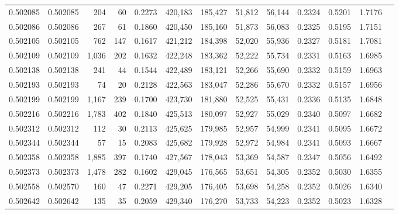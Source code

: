 \begin{tabular}{rrrrrrrrrrrrr}
0.502085 & 0.502085 &   204 &    60 &                                     0.2273 & 420,183 & 185,427 &  51,812 &  56,144 & 0.2324 & 0.5201 & 1.7176 \\
0.502086 & 0.502086 &   267 &    61 &                                     0.1860 & 420,450 & 185,160 &  51,873 &  56,083 & 0.2325 & 0.5195 & 1.7151 \\
0.502105 & 0.502105 &   762 &   147 &                                     0.1617 & 421,212 & 184,398 &  52,020 &  55,936 & 0.2327 & 0.5181 & 1.7081 \\
0.502109 & 0.502109 & 1,036 &   202 &                                     0.1632 & 422,248 & 183,362 &  52,222 &  55,734 & 0.2331 & 0.5163 & 1.6985 \\
0.502138 & 0.502138 &   241 &    44 &                                     0.1544 & 422,489 & 183,121 &  52,266 &  55,690 & 0.2332 & 0.5159 & 1.6963 \\
0.502193 & 0.502193 &    74 &    20 &                                     0.2128 & 422,563 & 183,047 &  52,286 &  55,670 & 0.2332 & 0.5157 & 1.6956 \\
0.502199 & 0.502199 & 1,167 &   239 &                                     0.1700 & 423,730 & 181,880 &  52,525 &  55,431 & 0.2336 & 0.5135 & 1.6848 \\
0.502216 & 0.502216 & 1,783 &   402 &                                     0.1840 & 425,513 & 180,097 &  52,927 &  55,029 & 0.2340 & 0.5097 & 1.6682 \\
0.502312 & 0.502312 &   112 &    30 &                                     0.2113 & 425,625 & 179,985 &  52,957 &  54,999 & 0.2341 & 0.5095 & 1.6672 \\
0.502344 & 0.502344 &    57 &    15 &                                     0.2083 & 425,682 & 179,928 &  52,972 &  54,984 & 0.2341 & 0.5093 & 1.6667 \\
0.502358 & 0.502358 & 1,885 &   397 &                                     0.1740 & 427,567 & 178,043 &  53,369 &  54,587 & 0.2347 & 0.5056 & 1.6492 \\
0.502373 & 0.502373 & 1,478 &   282 &                                     0.1602 & 429,045 & 176,565 &  53,651 &  54,305 & 0.2352 & 0.5030 & 1.6355 \\
0.502558 & 0.502570 &   160 &    47 &                                     0.2271 & 429,205 & 176,405 &  53,698 &  54,258 & 0.2352 & 0.5026 & 1.6340 \\
0.502642 & 0.502642 &   135 &    35 &                                     0.2059 & 429,340 & 176,270 &  53,733 &  54,223 & 0.2352 & 0.5023 & 1.6328 \\

\end{tabular}
